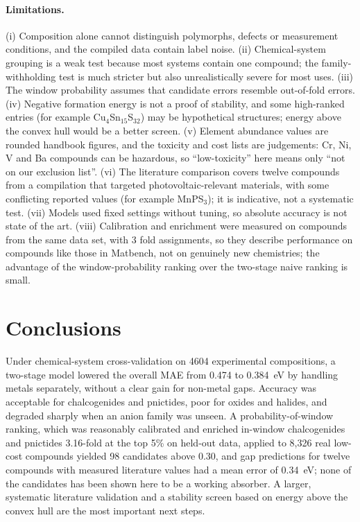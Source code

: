 \documentclass[11pt,a4paper]{article}
\begin{document}
\paragraph{Limitations.}
(i) Composition alone cannot distinguish polymorphs, defects or measurement conditions, and the compiled data contain label noise. (ii) Chemical-system grouping is a weak test because most systems contain one compound; the family-withholding test is much stricter but also unrealistically severe for most uses.
(iii) The window probability assumes that candidate errors resemble out-of-fold errors. (iv) Negative formation energy is not a proof of stability, and some high-ranked entries (for example Cu$_4$Sn$_{15}$S$_{32}$) may be hypothetical structures; energy above the convex hull would be a better screen. (v) Element abundance values are rounded handbook figures, and the toxicity and cost lists are judgements: Cr, Ni, V and Ba compounds can be hazardous, so ``low-toxicity'' here means only ``not on our exclusion list''.
(vi) The literature comparison covers twelve compounds from a compilation that targeted photovoltaic-relevant materials, with some conflicting reported values (for example MnPS$_3$); it is indicative, not a systematic test. (vii) Models used fixed settings without tuning, so absolute accuracy is not state of the art. (viii) Calibration and enrichment were measured on compounds from the same data set, with 3 fold assignments, so they describe performance on compounds like those in Matbench, not on genuinely new chemistries; the advantage of the window-probability ranking over the two-stage naive ranking is small.

\section{Conclusions}
Under chemical-system cross-validation on 4604 experimental compositions, a two-stage model lowered the overall MAE from 0.474 to 0.384~eV by handling metals separately, without a clear gain for non-metal gaps.
Accuracy was acceptable for chalcogenides and pnictides, poor for oxides and halides, and degraded sharply when an anion family was unseen. A probability-of-window ranking, which was reasonably calibrated and enriched in-window chalcogenides and pnictides 3.16-fold at the top 5\% on held-out data, applied to 8,326 real low-cost compounds yielded 98 candidates above 0.30, and gap predictions for twelve compounds with measured literature values had a mean error of 0.34~eV; none of the candidates has been shown here to be a working absorber. A larger, systematic literature validation and a stability screen based on energy above the convex hull are the most important next steps.
\end{document}
